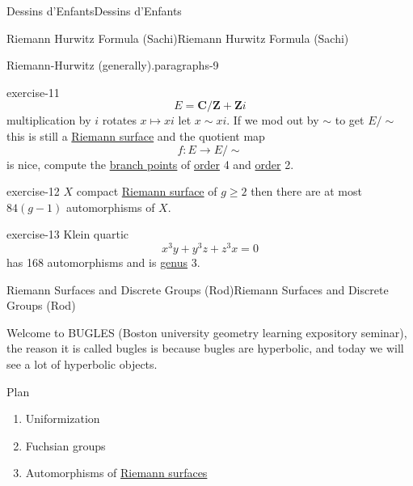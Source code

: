 \documentclass[10pt,]{book}
\numberwithin{equation}{section}
\newcommand{\ZZ}{\mathbf{Z}}
\newcommand{\CC}{\mathbf{C}}
\begin{document}
\begin{chapterptx}{Dessins d'Enfants}{}{Dessins d'Enfants}{}{}
\begin{sectionptx}{Riemann Hurwitz Formula (Sachi)}{}{Riemann Hurwitz Formula (Sachi)}{}{}
\begin{paragraphs}{Riemann-Hurwitz (generally).}{paragraphs-9}
\begin{inlineexercise}{}{exercise-11}%
\hypertarget{p-536}{}%
%
\begin{equation*}
E = \CC/ \ZZ + \ZZ i
\end{equation*}
multiplication by \(i\) rotates \(x \mapsto xi\) let \(x \sim xi\). If we mod out by \(\sim\) to get \(E/\sim\) this is still a \hyperref[def-top-riem-surface]{Riemann surface} and the quotient map%
\begin{equation*}
f \colon E \to E / \sim
\end{equation*}
is nice, compute the \hyperref[def-branch-point]{branch points}  of \hyperref[def-order-quaternion]{order} 4 and \hyperref[def-order-quaternion]{order} 2.%
\end{inlineexercise}
\begin{inlineexercise}{}{exercise-12}%
\hypertarget{p-537}{}%
\(X\) compact \hyperref[def-top-riem-surface]{Riemann surface} of \(g\ge 2\) then there are at most \(84(g-1)\) automorphisms of \(X\).%
\end{inlineexercise}
\begin{inlineexercise}{}{exercise-13}%
\hypertarget{p-538}{}%
Klein quartic%
\begin{equation*}
x^3 y + y^3 z + z^3 x = 0
\end{equation*}
has 168 automorphisms and is \hyperref[def-class-set]{genus} 3.%
\end{inlineexercise}
\end{paragraphs}%
\end{sectionptx}
%
%
\typeout{************************************************}
\typeout{************************************************}
%
\begin{sectionptx}{Riemann Surfaces and Discrete Groups (Rod)}{}{Riemann Surfaces and Discrete Groups (Rod)}{}{}\label{sec-rs-discrete-groups}
\begin{introduction}{}%
\hypertarget{p-539}{}%
Welcome to BUGLES (Boston university geometry learning expository seminar), the reason it is called bugles is because bugles are hyperbolic, and today we will see a lot of hyperbolic objects.%
\par
\hypertarget{p-540}{}%
Plan\leavevmode%
\begin{enumerate}
\item\hypertarget{li-106}{}Uniformization%
\item\hypertarget{li-107}{}Fuchsian groups%
\item\hypertarget{li-108}{}Automorphisms of \hyperref[def-top-riem-surface]{Riemann surfaces}%

\end{enumerate}
\end{introduction}
\end{sectionptx}
\end{chapterptx}
\end{document}

